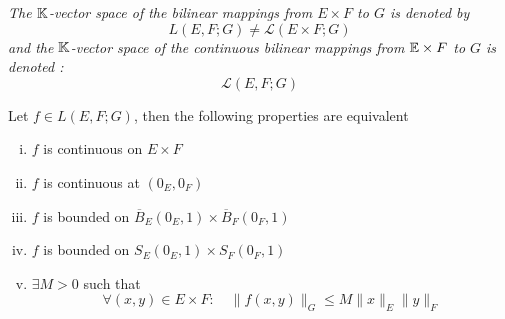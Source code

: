 \divider
\it 
The $\mathbb{K} $-vector space of the bilinear mappings from $E \times F  $ to $G $ is denoted by
\[
L (E,F;G)  \neq \mathcal{L} \left( E\times    F ;G  \right)
\]
and the $\mathbb{K} $-vector space of the continuous bilinear mappings from $\mathbb{E}  \times F  $  to $G $ 
is denoted : 
\[
\mathcal{L} (E,F ; G) 
\]
\divider
\normalfont

\begin{theorem}[Fundamental]
	Let $f  \in  L (E,F;G) $, then the following properties are equivalent 
	\begin{enumerate}[(i)]
	\item $f $ is continuous on $E \times F  $ 
	\item $f $ is continuous at $(0_{E},0_{F})  $  
	\item $f $ is bounded on $\overline{B}_{E}(0_{E},1) \times \overline{B}_{F}(0_{F},1)    $  
	\item $f $ is bounded on $S_{E} (0_{E},1) \times S_{F}(0_{F}, 1)   $  
	\item $\exists  M > 0 $  such that 
		\[
		\forall (x,y)  \in  E \times F : 
		\quad 
		\| f(x,y)  \| _{G} \leq M 
		\| x \| _{E} \| y \| _{F}
		\]
	\end{enumerate}
\end{theorem}
